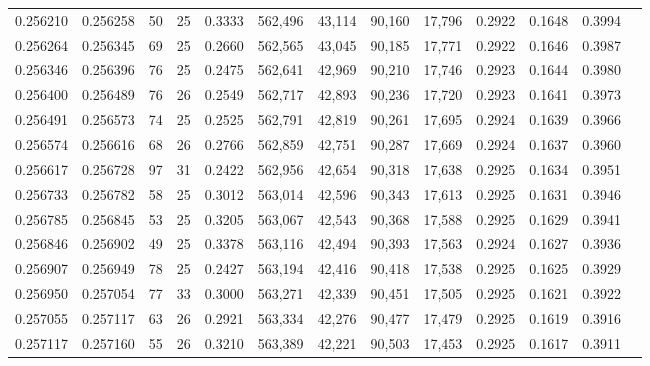 \begin{tabular}{rrrrrrrrrrrrr}
0.256210 & 0.256258 &  50 &  25 &                                     0.3333 & 562,496 &  43,114 &  90,160 &  17,796 & 0.2922 & 0.1648 & 0.3994 \\
0.256264 & 0.256345 &  69 &  25 &                                     0.2660 & 562,565 &  43,045 &  90,185 &  17,771 & 0.2922 & 0.1646 & 0.3987 \\
0.256346 & 0.256396 &  76 &  25 &                                     0.2475 & 562,641 &  42,969 &  90,210 &  17,746 & 0.2923 & 0.1644 & 0.3980 \\
0.256400 & 0.256489 &  76 &  26 &                                     0.2549 & 562,717 &  42,893 &  90,236 &  17,720 & 0.2923 & 0.1641 & 0.3973 \\
0.256491 & 0.256573 &  74 &  25 &                                     0.2525 & 562,791 &  42,819 &  90,261 &  17,695 & 0.2924 & 0.1639 & 0.3966 \\
0.256574 & 0.256616 &  68 &  26 &                                     0.2766 & 562,859 &  42,751 &  90,287 &  17,669 & 0.2924 & 0.1637 & 0.3960 \\
0.256617 & 0.256728 &  97 &  31 &                                     0.2422 & 562,956 &  42,654 &  90,318 &  17,638 & 0.2925 & 0.1634 & 0.3951 \\
0.256733 & 0.256782 &  58 &  25 &                                     0.3012 & 563,014 &  42,596 &  90,343 &  17,613 & 0.2925 & 0.1631 & 0.3946 \\
0.256785 & 0.256845 &  53 &  25 &                                     0.3205 & 563,067 &  42,543 &  90,368 &  17,588 & 0.2925 & 0.1629 & 0.3941 \\
0.256846 & 0.256902 &  49 &  25 &                                     0.3378 & 563,116 &  42,494 &  90,393 &  17,563 & 0.2924 & 0.1627 & 0.3936 \\
0.256907 & 0.256949 &  78 &  25 &                                     0.2427 & 563,194 &  42,416 &  90,418 &  17,538 & 0.2925 & 0.1625 & 0.3929 \\
0.256950 & 0.257054 &  77 &  33 &                                     0.3000 & 563,271 &  42,339 &  90,451 &  17,505 & 0.2925 & 0.1621 & 0.3922 \\
0.257055 & 0.257117 &  63 &  26 &                                     0.2921 & 563,334 &  42,276 &  90,477 &  17,479 & 0.2925 & 0.1619 & 0.3916 \\
0.257117 & 0.257160 &  55 &  26 &                                     0.3210 & 563,389 &  42,221 &  90,503 &  17,453 & 0.2925 & 0.1617 & 0.3911 \\

\end{tabular}

